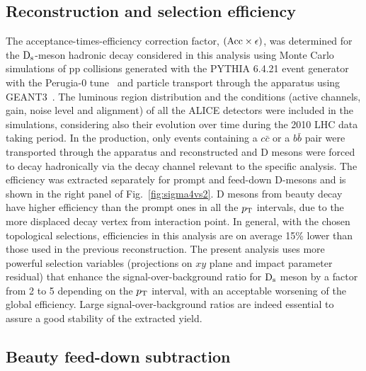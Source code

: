\subsection{Reconstruction and selection efficiency}
\label{sec:Effpp}
The acceptance-times-efficiency correction factor, 
$(\rm Acc \times \epsilon)$, was determined for the ${\rm D_s}$-meson
hadronic decay considered in this analysis using Monte Carlo simulations 
of pp collisions generated with the PYTHIA 6.4.21 event generator~\cite{Sjostrand:2006za} with the 
Perugia-0 tune~\cite{Skands:2010ak} and particle transport through the apparatus 
using GEANT3~\cite{Brun:1994aa}.
The luminous region distribution and the conditions (active channels, gain, 
noise level and alignment) of all the ALICE detectors were included in the 
simulations, considering also their evolution over time during the 2010 LHC 
data taking period.
In the production, only events containing a $c\bar{c}$ or a $b\bar{b}$ pair 
were transported through the apparatus and reconstructed and
D mesons were forced to decay hadronically via the decay channel relevant to
the specific analysis.
The efficiency was extracted separately for prompt and feed-down D-mesons and 
is shown in the right panel of Fig.~\ref{fig:sigma4vs2}.
D mesons from beauty decay have higher efficiency than
the prompt ones in all the $p_{\rm T}$ intervals, due to the more displaced 
decay vertex from interaction point.
In general, with the chosen topological selections, efficiencies in this analysis
are on average 15\% lower than those used in the previous reconstruction. 
The present analysis uses more powerful selection variables 
(projections on $xy$ plane and impact parameter residual) that
enhance the signal-over-background ratio for ${\rm D_s}$ meson by a factor 
from 2 to 5 depending on the $p_{\rm T}$ interval, with an acceptable worsening
of the global efficiency. Large signal-over-background ratios are indeed essential 
to assure a good stability of the extracted yield.

\subsection{Beauty feed-down subtraction}

